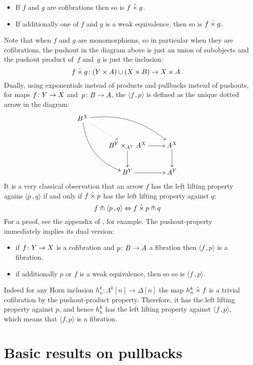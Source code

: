\documentclass[reqno,10pt,a4paper,oneside,draft]{amsart}
\begin{document}
\begin{itemize}
\item If $f$ and $g$ are cofibrations then so is $f \mathbin{\hat{\times}} g$.
\item If additionally one of $f$ and $g$ is a weak equivalence, then so is $f \mathbin{\hat{\times}} g$.
\end{itemize}
Note that when $f$ and $g$ are monomorphisms, so in particular when they are cofibrations, the pushout in the diagram above is just an union of subobjects and the pushout product of~$f$ and~$g$ is just the inclusion:
\[  
f \mathbin{\hat{\times}} g \colon (Y \times A) \cup (X \times B) \rightarrow X \times A \, .
\]
Dually, using  exponentials instead of products and pullbacks instead of pushouts, for maps $f \colon Y \rightarrow X$ and~$p \colon B \rightarrow A$, the   $\langle f \, , p \rangle$ is defined as the unique dotted arrow in the diagram:
\[
\xymatrix{
 B^X \ar@{.>}[dr] \ar@/^1.5pc/[drr] \ar@/_1.5pc/[ddr] \\
& B^Y \times_{A^Y} A^X \ar[r] \ar[d] &  A^X \ar[d]  \\
& B^Y \ar[r] & A^Y  \\
 }
 \]
It is a very classical observation that an arrow $f$ has the left lifting property agains $\langle p \, , q \rangle $ if and only if $f \mathbin{\hat{\times}} p$ has the left lifting property against $q$:
\[
f \pitchfork \langle p \, , q \rangle \Leftrightarrow f \mathbin{\hat{\times}} p \pitchfork q 
\]
 For a proof, see the appendix of \cite{joyal-tierney-segal}, for example. The pushout-property immediately implies its dual version: 
\begin{itemize}
\item if $f \colon Y \to X$ is a cofibration and $p \colon B \to A$ a fibration then $\langle f \, , p \rangle$ is a fibration.
\item if additionally $p$ or $f$ is a weak equivalence, then so so is $\langle f \, , p \rangle$.
\end{itemize}
 Indeed for any Horn inclusion $h^k_n: \Lambda^k[n] \rightarrow \Delta[n]$ the map $h^k_n \mathbin{\hat{\times}} f$ is a trivial cofibration by the pushout-product property. Therefore,  it has the left lifting property against $p$, and hence $h^k_n$ has the left lifting property against $\langle f \, , p  \rangle$, which means that   $\langle f, p \rangle$ is a fibration. 





\section{Basic results on pullbacks}
\end{document}
